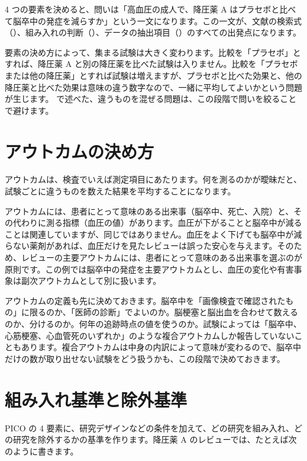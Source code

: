 4 つの要素を決めると、問いは「高血圧の成人で、降圧薬 A はプラセボと比べて脳卒中の発症を減らすか」という一文になります。この一文が、文献の検索式（）、組み入れの判断（）、データの抽出項目（）のすべての出発点になります。

要素の決め方によって、集まる試験は大きく変わります。比較を「プラセボ」とすれば、降圧薬 A と別の降圧薬を比べた試験は入りません。比較を「プラセボまたは他の降圧薬」とすれば試験は増えますが、プラセボと比べた効果と、他の降圧薬と比べた効果は意味の違う数字なので、一緒に平均してよいかという問題が生じます。 で述べた、違うものを混ぜる問題は、この段階で問いを絞ることで避けます。

\section{アウトカムの決め方}
\label{sec:02-2}

アウトカムは、検査でいえば測定項目にあたります。何を測るのかが曖昧だと、試験ごとに違うものを数えた結果を平均することになります。

アウトカムには、患者にとって意味のある出来事（脳卒中、死亡、入院）と、その代わりに測る指標（血圧の値）があります。血圧が下がることと脳卒中が減ることは関連していますが、同じではありません。血圧をよく下げても脳卒中が減らない薬剤があれば、血圧だけを見たレビューは誤った安心を与えます。そのため、レビューの主要アウトカムには、患者にとって意味のある出来事を選ぶのが原則です。この例では脳卒中の発症を主要アウトカムとし、血圧の変化や有害事象は副次アウトカムとして別に扱います。

アウトカムの定義も先に決めておきます。脳卒中を「画像検査で確認されたもの」に限るのか、「医師の診断」でよいのか。脳梗塞と脳出血を合わせて数えるのか、分けるのか。何年の追跡時点の値を使うのか。試験によっては「脳卒中、心筋梗塞、心血管死のいずれか」のような複合アウトカムしか報告していないこともあります。複合アウトカムは中身の内訳によって意味が変わるので、脳卒中だけの数が取り出せない試験をどう扱うかも、この段階で決めておきます。

\section{組み入れ基準と除外基準}
\label{sec:02-3}

PICO の 4 要素に、研究デザインなどの条件を加えて、どの研究を組み入れ、どの研究を除外するかの基準を作ります。降圧薬 A のレビューでは、たとえば次のように書きます。

